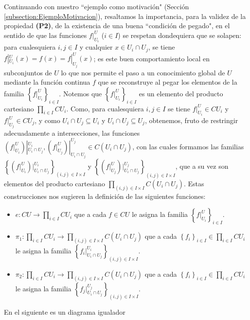 Continuando con nuestro ``ejemplo como motivación" (Sección \ref{subsection:EjemploMotivacion}), resaltamos la importancia, para la validez de la propiedad \textbf{(P2)}, de la existencia de una buena ``condición de pegado", en el sentido de que las funciones $f|^{U}_{U_i}$ ($i\in I$) se respetan dondequiera que se solapen: para cualesquiera $i,j\in I$ y cualquier $x\in U_i\cap U_j$, se tiene $f|^U_{U_i}(x)=f(x)=f|^U_{U_j}(x)$; es este buen comportamiento local en subconjuntos de $U$ lo que nos permite el paso a un conocimiento global de $U$ mediante la función continua $f$ que se reconstruye al pegar los elementos de la familia $\left\lbrace f|^U_{U_i}\right\rbrace_{i\in I}$. Notemos que $\left\lbrace f|^U_{U_i}\right\rbrace_{i\in I}$ es un elemento del producto cartesiano $\prod_{i\in I} CU_i$. Como, para cualesquiera $i,j\in I$ se tiene $f|^U_{U_i}\in CU_i$ y $f|^U_{U_j}\in CU_j$, y como $U_i\cap U_j\subseteq U_i$ y $U_i\cap U_j\subseteq U_j$, obtenemos, fruto de restringir adecuadamente a intersecciones, las funciones $({f|^U_{U_i}})|^{U_i}_{U_i\cap U_j}, ({f|^U_{U_j}})|^{U_j}_{U_i\cap U_j}\in C(U_i\cap U_j)$, con las cuales formamos las familias $\left\lbrace ({f|^U_{U_i}})|^{U_i}_{U_i\cap U_j}\right\rbrace_{(i,j)\in I\times I}$ y $\left\lbrace ({f|^U_{U_j}})|^{U_j}_{U_i\cap U_j}\right\rbrace_{(i,j)\in I\times I}$, que a su vez son elementos del producto cartesiano $\prod_{(i,j)\in I\times I}C(U_i\cap U_j)$. Estas construcciones nos sugieren la definición de las siguientes funciones:
\begin{itemize}
   \item $e:CU\to \prod_{i\in I}CU_i$ que a cada $f\in CU$ le asigna la familia $\left\lbrace f|^{U}_{U_i}\right\rbrace_{i\in I}$.
   \item $\pi_1:\prod_{i\in I}CU_i\to \prod_{(i,j)\in I\times I}C(U_i\cap U_j)$ que a cada $\left\lbrace f_i\right\rbrace_{i\in I}\in\prod_{i\in I}CU_i$ le asigna la familia $\left\lbrace {f_i}|^{U_i}_{U_i\cap U_j}\right\rbrace_{(i,j)\in I\times I}$.
   \item $\pi_2:\prod_{i\in I}CU_i\to \prod_{(i,j)\in I\times I}C(U_i\cap U_j)$ que a cada $\left\lbrace f_i\right\rbrace_{i\in I}\in\prod_{i\in I}CU_i$ le asigna la familia $\left\lbrace {f_j}|^{U_j}_{U_i\cap U_j}\right\rbrace_{(i,j)\in I\times I}$.
\end{itemize}
\begin{Prop}
   En  el siguiente es un diagrama igualador
   
\end{Prop}
